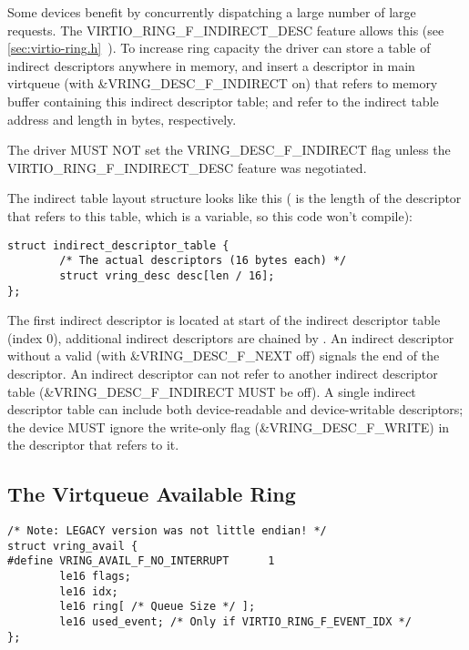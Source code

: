 Some devices benefit by concurrently dispatching a large number
of large requests. The VIRTIO_RING_F_INDIRECT_DESC feature allows this (see \ref{sec:virtio-ring.h}~). To increase
ring capacity the driver can store a table of indirect
descriptors anywhere in memory, and insert a descriptor in main
virtqueue (with \&VRING_DESC_F_INDIRECT on) that refers to memory buffer
containing this indirect descriptor table;  and 
refer to the indirect table address and length in bytes,
respectively.

The driver MUST NOT set the VRING_DESC_F_INDIRECT flag unless the
VIRTIO_RING_F_INDIRECT_DESC feature was negotiated.

The indirect table layout structure looks like this
( is the length of the descriptor that refers to this table,
which is a variable, so this code won't compile):

\begin{lstlisting}
struct indirect_descriptor_table {
        /* The actual descriptors (16 bytes each) */
        struct vring_desc desc[len / 16];
};
\end{lstlisting}

The first indirect descriptor is located at start of the indirect
descriptor table (index 0), additional indirect descriptors are
chained by . An indirect descriptor without a valid 
(with \&VRING_DESC_F_NEXT off) signals the end of the descriptor.
An
indirect descriptor can not refer to another indirect descriptor
table (\&VRING_DESC_F_INDIRECT MUST be off). A single indirect descriptor
table can include both device-readable and device-writable descriptors;
the device MUST ignore the write-only flag (\&VRING_DESC_F_WRITE) in the descriptor that refers to it.

\subsection{The Virtqueue Available Ring}\label{sec:Basic Facilities of a Virtio Device / Virtqueues / The Virtqueue Available Ring}

\begin{lstlisting}
/* Note: LEGACY version was not little endian! */
struct vring_avail {
#define VRING_AVAIL_F_NO_INTERRUPT      1
        le16 flags;
        le16 idx;
        le16 ring[ /* Queue Size */ ];
        le16 used_event; /* Only if VIRTIO_RING_F_EVENT_IDX */
};
\end{lstlisting}

